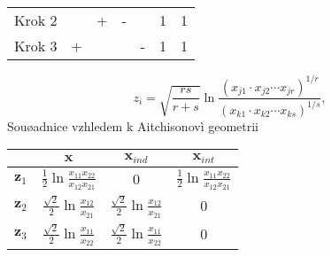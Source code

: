 \documentclass[landscape,a0paper,fontscale=0.285]{baposter} %
\begin{document}
\begin{poster}
{\begin{center}
\begin{tabular}{c c c c c c c}
Krok 2&&+&-&&1&1\\
Krok 3&+&&&-&1&1\\
\hline
\end{tabular}
\end{center}
\begin{displaymath}
z_{i} = \sqrt{\frac{rs}{r+s}}\ln\frac{(x_{j1}
\cdot x_{j2}\cdots  x_{jr} )^{1/r}}{(x_{k1}\cdot x_{k2}\cdots x_{ks})^{1/s}},
\end{displaymath}
Souøadnice vzhledem k Aitchisonovì geometrii
\begin{center}
\begin{tabular}{|c|ccc|}
\hline
&$\mathbf{x}$&$\mathbf{x}_{ind}$&$\mathbf{x}_{int}$\\\hline
$\mathbf{z}_{1}$&$\frac{1}{2}\mathrm{\ln}\frac{x_{11}x_{22}}{x_{12}x_{21}}$&$0$&$\frac{1}{2}\mathrm{\ln}\frac{x_{11}x_{22}}{x_{12}x_{21}}$\\
$\mathbf{z}_{2}$&$\frac{\sqrt{2}}{2}\mathrm{\ln}\frac{x_{12}}{x_{21}}$&$\frac{\sqrt{2}}{2}\mathrm{\ln}\frac{x_{12}}{x_{21}}$&$0$\\
$\mathbf{z}_{3}$&$\frac{\sqrt{2}}{2}\mathrm{\ln}\frac{x_{11}}{x_{22}}$&$\frac{\sqrt{2}}{2}\mathrm{\ln}\frac{x_{11}}{x_{22}}$&$0$\\[1mm]
\hline
\end{tabular}
\end{center}
}
\end{poster}
\end{document}
